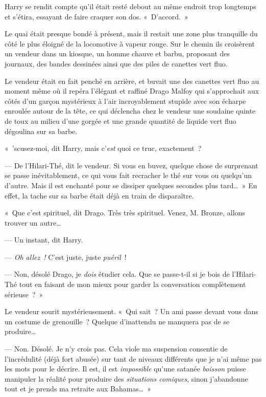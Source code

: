 Harry se rendit compte qu'il était resté debout au même endroit trop longtemps et s'étira, essayant de faire craquer son dos. «~D'accord.~»

Le quai était presque bondé à présent, mais il restait une zone plus tranquille du côté le plus éloigné de la locomotive à vapeur rouge.
Sur le chemin ils croisèrent un vendeur dans un kiosque, un homme chauve et barbu, proposant des journaux,  des bandes dessinées ainsi que des piles de canettes vert fluo.

Le vendeur était en fait penché en arrière, et buvait une des canettes vert fluo au moment même où il repéra l'élégant et raffiné Drago Malfoy qui s'approchait aux côtés d'un garçon mystérieux à l'air incroyablement stupide avec son écharpe enroulée autour de la tête, ce qui déclencha chez le vendeur une soudaine quinte de toux au milieu d'une gorgée et une grande quantité de liquide vert fluo dégoulina sur sa barbe.

«~'scusez-moi, dit Harry, mais c'\emph{est} quoi ce truc, exactement~?

--- De l'Hilari-Thé, dit le vendeur. Si vous en buvez, quelque chose de surprenant se passe inévitablement, ce qui vous fait recracher le thé sur vous ou quelqu'un d'autre.
Mais il est enchanté pour se dissiper quelques secondes plus tard…~»
En effet, la tache sur sa barbe était déjà en train de disparaître.

«~Que c'est spirituel, dit Drago. Très très spirituel. Venez, M. Bronze, allons trouver un autre…

--- Un instant, dit Harry.

--- \emph{Oh allez~!} C'est juste, juste \emph{puéril}~!

--- Non, désolé Drago, je \emph{dois} étudier cela.
Que se passe-t-il si je bois de l'Hilari-Thé tout en faisant de mon mieux pour garder la conversation complètement sérieuse~?~»

Le vendeur sourit mystérieusement.  «~Qui sait~? Un ami passe devant vous dans un costume de grenouille~?
Quelque d'inattendu ne manquera pas de se produire…

--- Non. Désolé. Je n'y crois pas.
Cela viole ma suspension consentie de l'incrédulité (déjà fort abusée) sur tant de niveaux différents que je n'ai même pas les mots pour le décrire.
Il est, il est \emph{impossible} qu'une satanée \emph{boisson} puisse manipuler la réalité pour produire des \emph{situations comiques}, sinon j'abandonne tout et je prends ma retraite aux Bahamas…~»

